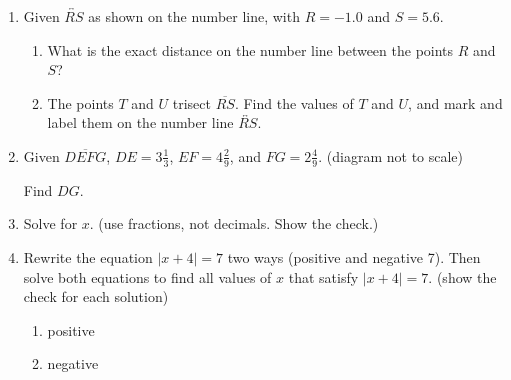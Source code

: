 \begin{enumerate}
\item Given $\overleftrightarrow{RS}$ as shown on the number line, with $R=-1.0$ and $S=5.6$. \par \medskip
  \begin{enumerate}
    \item What is the exact distance on the number line between the points $R$ and $S$? \vspace{2cm} 
    \item The points $T$ and $U$ trisect $\overline{RS}$. Find the values of $T$ and $U$, and mark and label them on the number line $\overleftrightarrow{RS}$. 
  \end{enumerate} \vspace{3cm}  

\newpage
\item Given $\overline{DEFG}$, $DE=3 \frac{1}{3}$, $EF=4 \frac{2}{9}$, and $FG= 2 \frac{4}{9}$. (diagram not to scale) \par \smallskip
  Find ${DG}$. \bigskip
  \begin{center}
  \end{center} \vspace{4cm}

\item Solve for $x$. (use fractions, not decimals. Show the check.)
\begin{enumerate}
\end{enumerate} \vspace{6cm}

\item Rewrite the equation $|x+4|=7$ two ways (positive and negative 7). Then solve both equations to find all values of $x$ that satisfy $|x+4|=7$. (show the check for each solution)
  \begin{multicols}{2} 
    \begin{enumerate}
      \item positive
      \item negative
    \end{enumerate}
  \end{multicols}


\end{enumerate}
